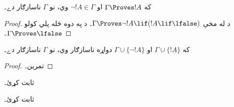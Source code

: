 \documentclass[../../../include/open-logic-section]{subfiles}
\begin{document}
\begin{prop}
  که $\Gamma \Proves !A$ او $\lnot !A \in \Gamma$ وي، نو
  $\Gamma$ ناسازګار دے۔
\end{prop}

\begin{proof}
  د  له مخې
  $\Gamma \Proves \lnot !A \lif (!A \lif \lfalse)$۔ د
   په دوه ځله پلي کولو
  $\Gamma \Proves \lfalse$۔
\end{proof}


\begin{prop}
  که $\Gamma \cup \{!A\}$ او $\Gamma \cup \{\lnot !A\}$ دواړه
  ناسازګار وي، نو $\Gamma$ ناسازګار دے۔
\end{prop}

\begin{proof}
تمرين۔
\end{proof}

\begin{prob}
   ثابت کړئ۔
\end{prob}
\tagendprob

\begin{prob}
   ثابت کړئ۔
\end{prob}
\tagendprob
\end{document}
